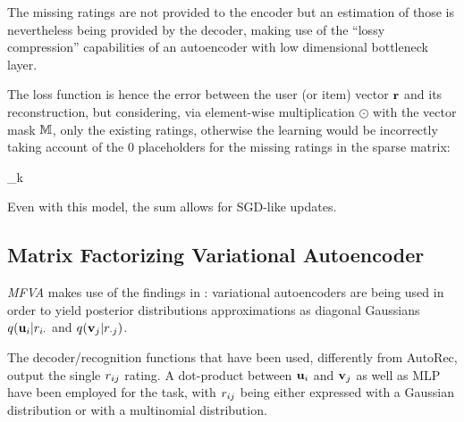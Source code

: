The missing ratings are not provided to the encoder
but an estimation of those is nevertheless being provided
by the decoder, making use of the ``lossy compression''
capabilities of an autoencoder with low dimensional bottleneck layer.

The loss function is hence the error
between the user (or item) vector $\mathbf{r}$ and its reconstruction, 
but considering, via element-wise 
multiplication $\odot$ with the vector mask $\mathbb{M}$,
only the existing ratings, otherwise the learning would be incorrectly
taking account of the 0 placeholders for the missing ratings in the sparse matrix:

\begin{nalign}
\min \sum_{k} 
    \ltwonorm{
    \left[\boldrk - \Dec{\Enc{\boldrk}} \right]
    \odot
    \maskk
}
\end{nalign}

Even with this model, the sum allows for SGD-like updates.

\subsection{Matrix Factorizing Variational Autoencoder}
\emph{MFVA} \cite{vanBaalen2016} makes use of the findings in \cite{1312.6114}:
variational autoencoders are being used in order to yield
posterior distributions approximations as diagonal Gaussians 
$q(\mathbf{u}_i|r_{i\cdot}$ and $q(\mathbf{v}_j|r_{\cdot j})$.

The decoder/recognition functions that have been used, differently from AutoRec,
output the single $r_{ij}$ rating. A dot-product between $\mathbf{u}_i$ and $\mathbf{v}_j$
as well as MLP have been employed for the task, with $r_{ij}$ being
either expressed with a Gaussian distribution or with a multinomial distribution.
